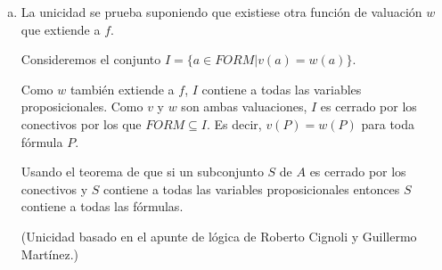 \begin{questions}
\begin{solution}
\begin{enumerate}[a)]
\begin{enumerate}[\quad]
    \begin{itemize}
      \item Si $a=\neg b$, entonces $comp(b) = n$. Por H.I., $v(b)$ est\'a definido. Queda que $v(a) = 1 - v(b)$. 
      
      \item Si $a=b*c$, con $* \in \{\wedge, \vee, \rightarrow \}$. Entonces $comp(b)$ y $comp(b)$ son menores a $n+1$. Por H.I. $v(b)$ y $v(c)$ est\'an definidos. Por lo tanto: 
      
      \begin{eqnarray*}
      v(a) = \min(v(b), v(c)) & \text{si } a = b \wedge c\\
      v(a) = \max(v(b), v(c)) & \text{si } a = b \vee c \\
      v(a) = \max(1-v(b), v(c)) & \text{si } a = b \rightarrow c
      \end{eqnarray*}
      
      La funci\'on $v$ queda definido para toda f\'ormula de cualquier complejidad.
    \end{itemize}
  \end{enumerate}
 \item La unicidad se prueba suponiendo que existiese otra funci\'on de valuaci\'on $w$ que extiende a $f$. 
 
 Consideremos el conjunto $I = \{a\in FORM | v(a) = w(a) \}$. 
 
 Como $w$ tambi\'en extiende a $f$, $I$ contiene a todas las variables proposicionales. Como $v$ y $w$ son ambas valuaciones, $I$ es cerrado por los conectivos por los que $FORM \subseteq I$. Es decir, $v(P) =w(P)$ para toda f\'ormula $P$. 
 
 Usando el teorema de que si un subconjunto $S$ de $A$ es cerrado por los conectivos y $S$ contiene a todas las variables proposicionales entonces $S$ contiene a todas las f\'ormulas. 
 
 (Unicidad basado en el apunte de lógica de Roberto Cignoli y Guillermo Martínez.)
\end{enumerate}

\end{solution}

\end{questions}